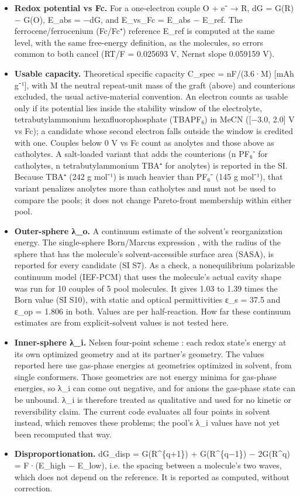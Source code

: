 \documentclass[journal=jcisd8,manuscript=article]{achemso}
\begin{document}
\begin{itemize}
\item \textbf{Redox potential vs Fc.} For a one-electron couple O + e⁻ → R, dG = G(R) − G(O), E\_abs = −dG, and E\_vs\_Fc = E\_abs − E\_ref. The ferrocene/ferrocenium (Fc/Fc⁺) reference E\_ref is computed at the same level, with the same free-energy definition, as the molecules, so errors common to both cancel (RT/F = 0.025693 V, Nernst slope 0.059159 V).
\item \textbf{Usable capacity.} Theoretical specific capacity C\_spec = nF/(3.6·M) [mAh g⁻¹], with M the neutral repeat-unit mass of the graft (above) and counterions excluded, the usual active-material convention. An electron counts as usable only if its potential lies inside the stability window of the electrolyte, tetrabutylammonium hexafluorophosphate (TBAPF₆) in MeCN ([−3.0, 2.0] V vs Fc); a candidate whose second electron falls outside the window is credited with one. Couples below 0 V vs Fc count as anolytes and those above as catholytes. A salt-loaded variant that adds the counterions (n PF₆⁻ for catholytes, n tetrabutylammonium TBA⁺ for anolytes) is reported in the SI. Because TBA⁺ (242 g mol⁻¹) is much heavier than PF₆⁻ (145 g mol⁻¹), that variant penalizes anolytes more than catholytes and must not be used to compare the pools; it does not change Pareto-front membership within either pool.
\item \textbf{Outer-sphere λ\_o.} A continuum estimate of the solvent's reorganization energy. The single-sphere Born/Marcus expression \cite{born1920,marcus1956}, with the radius of the sphere that has the molecule's solvent-accessible surface area (SASA), is reported for every candidate (SI S7). As a check, a nonequilibrium polarizable continuum model (IEF-PCM) \cite{cances1997} that uses the molecule's actual cavity shape was run for 10 couples of 5 pool molecules. It gives 1.03 to 1.39 times the Born value (SI S10), with static and optical permittivities ε\_s = 37.5 and ε\_op = 1.806 in both. Values are per half-reaction. How far these continuum estimates are from explicit-solvent values is not tested here.
\item \textbf{Inner-sphere λ\_i.} Nelsen four-point scheme \cite{nelsen1987}: each redox state's energy at its own optimized geometry and at its partner's geometry. The values reported here use gas-phase energies at geometries optimized in solvent, from single conformers. Those geometries are not energy minima for gas-phase energies, so λ\_i can come out negative, and for anions the gas-phase state can be unbound. λ\_i is therefore treated as qualitative and used for no kinetic or reversibility claim. The current code evaluates all four points in solvent instead, which removes these problems; the pool's λ\_i values have not yet been recomputed that way.
\item \textbf{Disproportionation.} dG\_disp = G(R\textasciicircum{}\{q+1\}) + G(R\textasciicircum{}\{q−1\}) − 2G(R\textasciicircum{}q) = F·(E\_high − E\_low), i.e. the spacing between a molecule's two waves, which does not depend on the reference. It is reported as computed, without correction.
\end{itemize}
\end{document}
